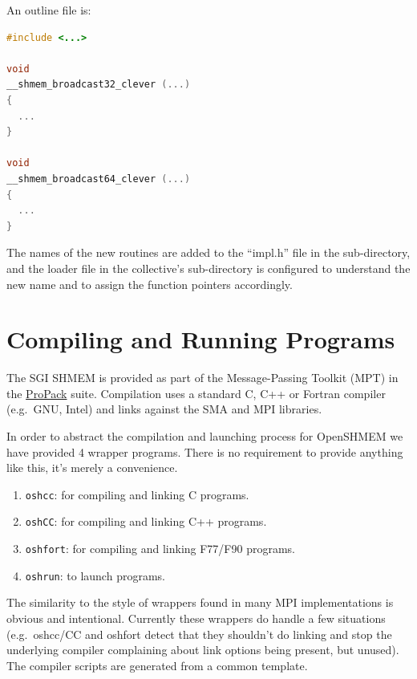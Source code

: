 \documentclass[english]{article}
\begin{document}
\noindent
An outline file is:

\vspace{0.1in}
\begin{minipage}{0.75\linewidth}
\begin{lstlisting}[language=C,caption={Outline of broadcast implementation}]
#include <...>

void
__shmem_broadcast32_clever (...)
{
  ...
}

void
__shmem_broadcast64_clever (...)
{
  ...
}
\end{lstlisting}
\end{minipage}
\vspace{0.1in}

The names of the new routines are added to the ``impl.h'' file in the
sub-directory, and the loader file in the collective's sub-directory
is configured to understand the new name and to assign the function
pointers accordingly.

\section{Compiling and Running Programs}

The SGI SHMEM is provided as part of the Message-Passing Toolkit (MPT)
in the
\href{http://www.sgi.com/products/software/propack.html}{ProPack}
suite. Compilation uses a standard C, C++ or Fortran compiler
(e.g.\ GNU, Intel) and links against the SMA and MPI libraries.

In order to abstract the compilation and launching process for
OpenSHMEM we have provided 4 wrapper programs.  There is no
requirement to provide anything like this, it's merely a convenience.

\begin{enumerate}
\item \texttt{oshcc}: for compiling and linking C programs.
\item \texttt{oshCC}: for compiling and linking C++ programs.
\item \texttt{oshfort}: for compiling and linking F77/F90 programs.
\item \texttt{oshrun}: to launch programs.
\end{enumerate}

The similarity to the style of wrappers found in many MPI
implementations is obvious and intentional. Currently these wrappers
do handle a few situations (e.g.\ oshcc/CC and oshfort detect that they
shouldn't do linking and stop the underlying compiler complaining
about link options being present, but unused). The compiler scripts
are generated from a common template.
\end{document}
